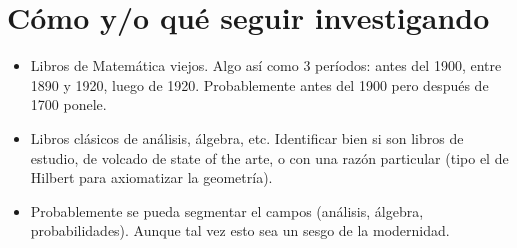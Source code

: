 \documentclass[a4paper,11pt]{article}
\begin{document}
\section{Cómo y/o qué seguir investigando}
\begin{itemize}
	\item Libros de Matemática viejos. Algo así como 3 períodos: antes del 1900, entre 1890 y 1920, luego de 1920. Probablemente antes del 1900 pero después de 1700 ponele.
	\item Libros clásicos de análisis, álgebra, etc. Identificar bien si son libros de estudio, de volcado de state of the arte, o con una razón particular (tipo el de Hilbert para axiomatizar la geometría).
	\item Probablemente se pueda segmentar el campos (análisis, álgebra, probabilidades). Aunque tal vez esto sea un sesgo de la modernidad.
	
\end{itemize}
\end{document}
